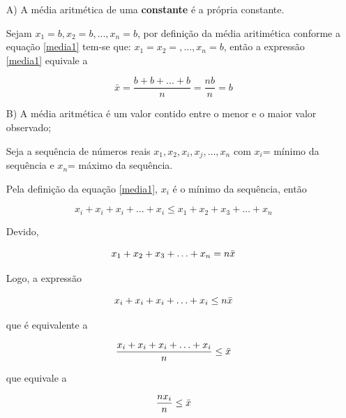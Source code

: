\begin{enumerate}
\item [{A)}] A média aritmética de uma \textbf{constante} é a própria constante.

\vskip0.3cm
\textbf{} 

Sejam  $x_{1}=b, x_{2}=b, ..., x_{n}=b$, por definição da média aritimética conforme a equação \ref{media1} tem-se que: $x_{1}=x_{2}=,..., x_{n}=b$, então a expressão \ref{media1} equivale a

\begin{equation*}\label{propriedade1}
\bar{x}=\frac{b+b+...+b}{n}=\frac{nb}{n}=b
\end{equation*}
 

\item [{B)}] A média aritmética é um valor contido entre o menor e o maior valor observado; 

\vskip0.3cm
\textbf{} 

Seja a sequência de números reais $x_{1},x_{2},x_{i},x_{j},\ldots,x_{n}$ com $x_{i}$= mínimo da sequência e $x_{n}$= máximo da sequência. \vskip0.3cm

Pela definição da equação \ref{media1}, $x_{i}$ é o mínimo da sequência, então 

\begin{equation*}\label{propriedade1}
x_{i}+x_{i}+x_{i}+\ldots+x_{i} \leq  x_{1}+x_{2}+x_{3}+\ldots+x_{n}
\end{equation*}

Devido,

\begin{equation*}\label{propriedade1}
x_{1}+x_{2}+x_{3}+\ldots+x_{n}=n \Bar{x}
\end{equation*}

Logo, a expressão

\begin{equation*}\label{propriedade1}
x_{i}+x_{i}+x_{i}+\ldots+x_{i} \leq n \Bar{x}
\end{equation*}

que é equivalente a 

\begin{equation*}\label{propriedade1}
\frac{x_{i}+x_{i}+x_{i}+\ldots+x_{i}}{n} \leq \Bar{x}
\end{equation*}

que equivale a 

\begin{equation*}\label{propriedade1}
\frac{nx_{i}}{n} \leq \Bar{x}
\end{equation*}


\end{enumerate}
